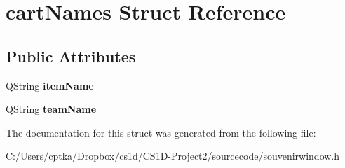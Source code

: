\hypertarget{structcart_names}{}\section{cart\+Names Struct Reference}
\label{structcart_names}
\subsection*{Public Attributes}
\begin{DoxyCompactItemize}
\item 
\mbox{\label{structcart_names_a6d14a0b9d401ef0af7e7154de6285caa}} 
Q\+String {\bfseries item\+Name}
\item 
\mbox{\label{structcart_names_a500408da5f0a027480f68711279d6ccc}} 
Q\+String {\bfseries team\+Name}
\end{DoxyCompactItemize}


The documentation for this struct was generated from the following file\+:\begin{DoxyCompactItemize}
\item 
C\+:/\+Users/cptka/\+Dropbox/cs1d/\+C\+S1\+D-\/\+Project2/sourcecode/souvenirwindow.\+h\end{DoxyCompactItemize}
